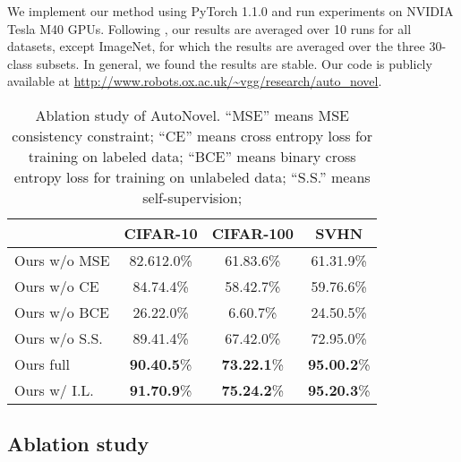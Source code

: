 We implement our method using PyTorch 1.1.0 and run experiments on NVIDIA Tesla M40 GPUs. Following \cite{han2019learning}, our results are averaged over 10 runs for all datasets, except ImageNet, for which the results are averaged over the three 30-class subsets.  In general, we found the results are stable. Our code is publicly available at \url{http://www.robots.ox.ac.uk/~vgg/research/auto_novel}.

\begin{table}[t]
\centering
\caption{Ablation study of AutoNovel. ``MSE'' means MSE consistency constraint; ``CE'' means cross entropy loss for training on labeled data; ``BCE'' means binary cross entropy loss for training on unlabeled data; ``S.S.'' means self-supervision;  }\label{tab:ablation_unlabelled}
\begin{tabular}[c]{lccc}
\toprule
          & CIFAR-10     & CIFAR-100     & SVHN \\
\midrule
Ours w/o MSE & 82.612.0\% & 61.83.6\% & 61.31.9\%   \\
Ours w/o CE & 84.74.4\%  & 58.42.7\% & 59.76.6\%  \\
Ours w/o BCE & 26.22.0\%  & 6.60.7\% & 24.50.5\% \\
Ours w/o S.S.& 89.41.4\%  & 67.42.0\% & 72.95.0\% \\\midrule
Ours full   & \textbf{90.40.5}\% & \textbf{73.22.1}\%  & \textbf{95.00.2}\% \\
Ours w/ I.L.  & \textbf{91.70.9}\% & \textbf{75.24.2}\% & \textbf{95.20.3}\% \\
\bottomrule
\end{tabular}\hfill 

\end{table} 
\subsection{Ablation study}

